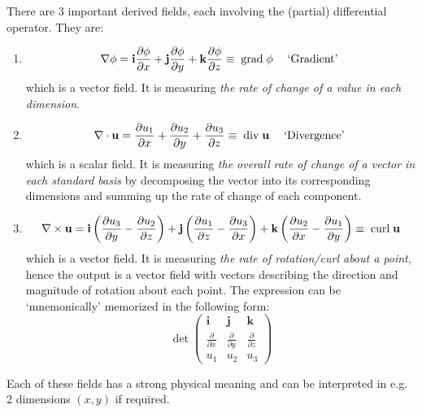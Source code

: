\documentclass[12pt]{report}
\theoremstyle{definition}
\begin{document}
There are 3 important derived fields, each involving the (partial) differential operator. They are:
\begin{enumerate}[label = (\arabic*)]
    \item 
        \[
            \nabla \phi = \mathbf{i}\frac{\partial\phi}{\partial x}
            + \mathbf{j}\frac{\partial\phi}{\partial y} + \mathbf{k}\frac{\partial\phi}{\partial z}
            \equiv \;\textnormal{grad}\;\phi \quad\;\textnormal{`Gradient'}\;
        \]which is a vector field.
        It is measuring \emph{the rate of change of a value in each dimension}.
        
    \item 
        \[
            \nabla \cdot \mathbf{u} = \frac{\partial u_1}{\partial x} 
            + \frac{\partial u_2}{\partial y} + \frac{\partial u_3}{\partial z}
            \equiv \;\textnormal{div}\;\mathbf{u} \quad\;\textnormal{`Divergence'}\;
        \]which is a scalar field.
        It is measuring \emph{the overall rate of change of a vector in each standard basis}
        by decomposing the vector into its corresponding dimensions
        and summing up the rate of change of each component.

    \item 
        \[
            \nabla \times \mathbf{u} = \mathbf{i}\left(\frac{\partial u_3}{\partial y}
            - \frac{\partial u_2}{\partial z}\right)
            + \mathbf{j}\left(\frac{\partial u_1}{\partial z} - \frac{\partial u_3}{\partial x}\right)
            + \mathbf{k}\left(\frac{\partial u_2}{\partial x} - \frac{\partial u_1}{\partial y}\right)
            \equiv \;\textnormal{curl}\;\mathbf{u}
        \]which is a vector field.
        It is measuring \emph{the rate of rotation/curl about a point},
        hence the output is a vector field with vectors describing the
        direction and magnitude of rotation about each point.
        The expression can be `mnemonically' memorized in the following form:\[
            \det{\begin{pmatrix}
                    \mathbf{i} & \mathbf{j} & \mathbf{k} \\
                    \frac{\partial}{\partial x} & \frac{\partial}{\partial y} & \frac{\partial}{\partial z} \\
                    u_1 & u_2 & u_3
            \end{pmatrix} }
        \]
\end{enumerate}

Each of these fields has a strong physical meaning and can be interpreted in
e.g. 2 dimensions $(x,y)$ if required.
\end{document}
